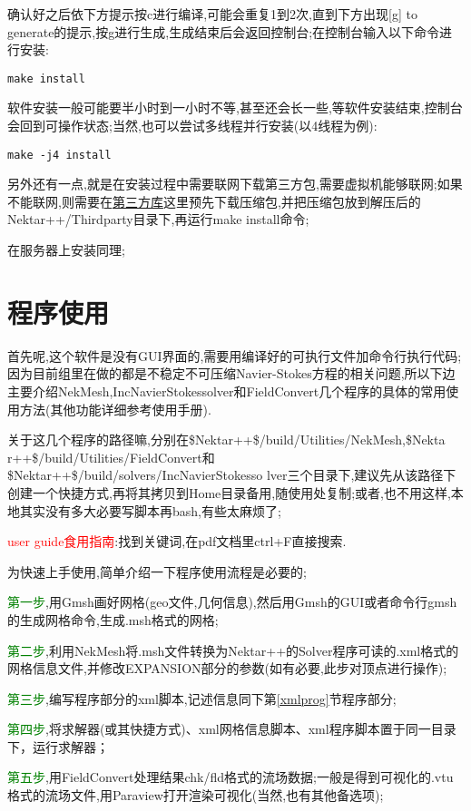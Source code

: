 \par
确认好之后依下方提示按c进行编译,可能会重复1到2次,直到下方出现[g] to generate的提示,按g进行生成,生成结束后会返回控制台;在控制台输入以下命令进行安装:\par
\begin{lstlisting}[frame=single]
	make install
\end{lstlisting}
\par
软件安装一般可能要半小时到一小时不等,甚至还会长一些,等软件安装结束,控制台会回到可操作状态;当然,也可以尝试多线程并行安装(以4线程为例):
\begin{lstlisting}[frame=single]
	make -j4 install
\end{lstlisting}
\par

另外还有一点,就是在安装过程中需要联网下载第三方包,需要虚拟机能够联网;如果不能联网,则需要在\href{https://www.nektar.info/thirdparty/}{第三方库}这里预先下载压缩包,并把压缩包放到解压后的Nektar++/Thirdparty目录下,再运行make install命令;\par
在服务器上安装同理;

\section{程序使用}

首先呢,这个软件是没有GUI界面的,需要用编译好的可执行文件加命令行执行代码;因为目前组里在做的都是不稳定不可压缩Navier-Stokes方程的相关问题,所以下边主要介绍NekMesh,IncNavierStokessolver和FieldConvert几个程序的具体的常用使用方法(其他功能详细参考使用手册).\par

关于这几个程序的路径嘛,分别在\$Nektar++\$/build/Utilities/NekMesh,\$Nekta r++\$/build/Utilities/FieldConvert和\$Nektar++\$/build/solvers/IncNavierStokesso lver三个目录下,建议先从该路径下创建一个快捷方式,再将其拷贝到Home目录备用,随使用处复制;或者,也不用这样,本地其实没有多大必要写脚本再bash,有些太麻烦了;\par

\textcolor{red}{user guide食用指南}:找到关键词,在pdf文档里ctrl+F直接搜索.\par

为快速上手使用,简单介绍一下程序使用流程是必要的;\par

\textcolor{green}{第一步},用Gmsh画好网格(geo文件,几何信息),然后用Gmsh的GUI或者命令行gmsh的生成网格命令,生成.msh格式的网格;\par
\textcolor{green}{第二步},利用NekMesh将.msh文件转换为Nektar++的Solver程序可读的.xml格式的网格信息文件,并修改EXPANSION部分的参数(如有必要,此步对顶点进行操作);\par
\textcolor{green}{第三步},编写程序部分的xml脚本,记述信息同下第\ref{xmlprog}节程序部分;\par
\textcolor{green}{第四步},将求解器(或其快捷方式)、xml网格信息脚本、xml程序脚本置于同一目录下，运行求解器；\par
\textcolor{green}{第五步},用FieldConvert处理结果chk/fld格式的流场数据;一般是得到可视化的.vtu格式的流场文件,用Paraview打开渲染可视化(当然,也有其他备选项);

